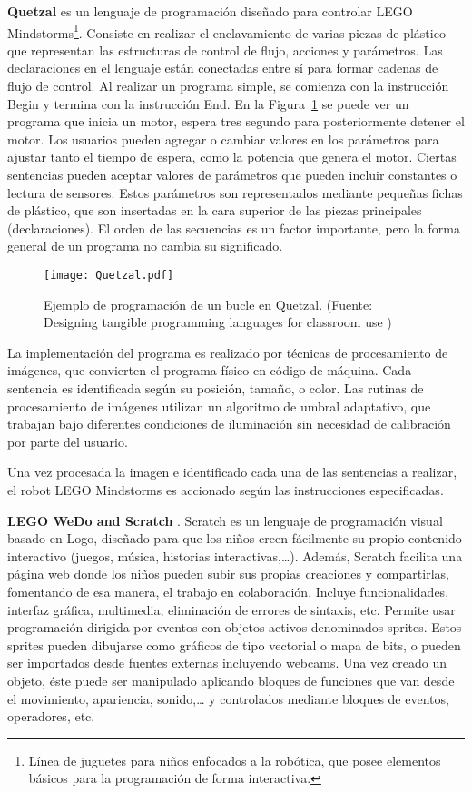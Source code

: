 \textbf{Quetzal} \cite{Quetzal} es un lenguaje de programación diseñado para controlar LEGO Mindstorms\footnote{Línea de juguetes para niños enfocados a la robótica, que posee elementos básicos para la programación de forma interactiva.}. Consiste en realizar el enclavamiento de varias piezas de plástico que representan las estructuras de control de flujo, acciones y parámetros. Las declaraciones en el lenguaje están conectadas entre sí para formar cadenas de flujo de control.
Al realizar un programa simple, se comienza con la instrucción Begin y termina con la instrucción End. En la Figura~\ref{fig:Quetzal} se puede ver un programa que inicia un motor, espera tres segundo para posteriormente detener el motor. Los usuarios pueden agregar o cambiar valores en los parámetros para ajustar tanto el tiempo de espera, como la potencia que genera el motor. Ciertas sentencias pueden aceptar valores de parámetros que pueden incluir constantes o lectura de sensores. Estos parámetros son representados mediante pequeñas fichas de plástico, que son insertadas en la cara superior de las piezas principales (declaraciones). El orden de las secuencias es un factor importante, pero la forma general de un programa no cambia su significado.

\begin{figure}[!h]
\begin{center}
\texttt{[image: Quetzal.pdf]}
\caption{Ejemplo de programación de un bucle en Quetzal. (Fuente: Designing tangible programming languages for classroom use \cite{Quetzal})}
\label{fig:Quetzal}
\end{center}
\end{figure}

La implementación del programa es realizado por técnicas de procesamiento de imágenes, que convierten el programa físico en código de máquina. Cada sentencia es identificada según su posición, tamaño, o color. Las rutinas de procesamiento de imágenes utilizan un algoritmo de umbral adaptativo, que trabajan bajo diferentes condiciones de iluminación sin necesidad de calibración por parte del usuario. 

Una vez procesada la imagen e identificado cada una de las sentencias a realizar, el robot LEGO Mindstorms es accionado según las instrucciones especificadas.

\textbf{LEGO WeDo and Scratch} \cite{ScratchWeDo}. Scratch \cite{Scratch} es un lenguaje de programación visual basado en Logo, diseñado para que los niños creen fácilmente su propio contenido interactivo (juegos, música, historias interactivas,…). Además, Scratch facilita una página web donde los niños pueden subir sus propias creaciones y compartirlas, fomentando de esa manera, el trabajo en colaboración. Incluye funcionalidades, interfaz gráfica, multimedia, eliminación de errores de sintaxis, etc. Permite usar programación dirigida por eventos con objetos activos denominados sprites. Estos sprites pueden dibujarse como gráficos de tipo vectorial o mapa de bits, o pueden ser importados desde fuentes externas incluyendo webcams. Una vez creado un objeto, éste puede ser manipulado aplicando bloques de funciones que van desde el movimiento, apariencia, sonido,… y controlados mediante bloques de eventos, operadores, etc.

